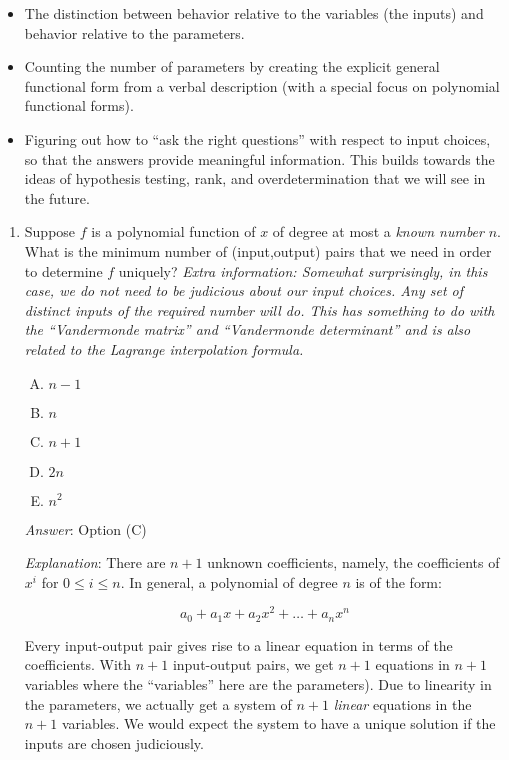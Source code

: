 \documentclass[10pt]{amsart}
\begin{document}
\begin{itemize}
\item The distinction between behavior relative to the variables (the
  inputs) and behavior relative to the parameters.
\item Counting the number of parameters by creating the explicit
  general functional form from a verbal description (with a special
  focus on polynomial functional forms).
\item Figuring out how to ``ask the right questions'' with respect to
  input choices, so that the answers provide meaningful
  information. This builds towards the ideas of hypothesis testing,
  rank, and overdetermination that we will see in the future.
\end{itemize}

\begin{enumerate}
\item Suppose $f$ is a polynomial function of $x$ of degree at most a
  {\em known number} $n$. What is the minimum number of (input,output)
  pairs that we need in order to determine $f$ uniquely? {\em Extra
    information: Somewhat surprisingly, in this case, we do not need
    to be judicious about our input choices. Any set of distinct
    inputs of the required number will do. This has something to do
    with the ``Vandermonde matrix'' and ``Vandermonde determinant''
    and is also related to the Lagrange interpolation formula.}

  \begin{enumerate}[(A)]
  \item $n - 1$
  \item $n$
  \item $n + 1$
  \item $2n$
  \item $n^2$
  \end{enumerate}

  {\em Answer}: Option (C)

  {\em Explanation}: There are $n + 1$ unknown coefficients, namely,
  the coefficients of $x^i$ for $0 \le i \le n$. In general, a
  polynomial of degree $n$ is of the form:

  $$a_0 + a_1x + a_2x^2 + \dots + a_nx^n$$

  Every input-output pair gives rise to a linear equation in terms of
  the coefficients. With $n + 1$ input-output pairs, we get $n + 1$
  equations in $n + 1$ variables where the ``variables'' here are the
  parameters). Due to linearity in the parameters, we actually get a
  system of $n + 1$ {\em linear} equations in the $n + 1$
  variables. We would expect the system to have a unique solution if
  the inputs are chosen judiciously.


\end{enumerate}
\end{document}
